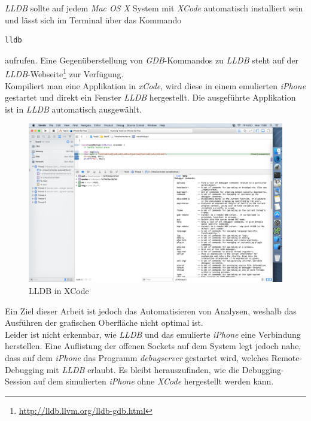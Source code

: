\textit{LLDB} sollte auf jedem \textit{Mac OS X} System mit \textit{XCode} automatisch installiert sein und lässt sich im Terminal über das Kommando
\begin{lstlisting}
lldb
\end{lstlisting} aufrufen. Eine Gegenüberstellung von \textit{GDB}-Kommandos zu \textit{LLDB} steht auf der \textit{LLDB}-Webseite\footnote{\url{http://lldb.llvm.org/lldb-gdb.html}} zur Verfügung.\\

 Kompiliert man eine Applikation in \textit{xCode}, wird diese in einem emulierten \textit{iPhone} ge\-star\-tet und direkt ein Fenster \textit{LLDB} hergestellt. Die ausgeführte Applikation ist in \textit{LLDB} automatisch ausgewählt.\\

\begin{figure}[htbp]
	\centering
	\includegraphics[width=\textwidth]{bilder/pentest_mobile_anwendungen/vergleich_aktuelle_situation/20160627_XCode-LLDB.png}
	\caption{LLDB in XCode}
	\label{fig:LLDBinXCode}
\end{figure}
Ein Ziel dieser Arbeit ist jedoch das Automatisieren von Analysen, weshalb das Ausführen der grafischen Oberfläche nicht optimal ist.\\

Leider ist nicht erkennbar, wie \textit{LLDB} und das emulierte \textit{iPhone} eine Verbindung herstellen. Eine Auflistung der offenen Sockets auf dem System legt jedoch nahe, dass auf dem \textit{iPhone} das Programm \textit{debugserver} gestartet wird, welches Remote-Debugging mit \textit{LLDB} erlaubt. Es bleibt herauszufinden, wie die Debugging-Session auf dem simulierten \textit{iPhone} ohne \textit{XCode} hergestellt werden kann.\\

